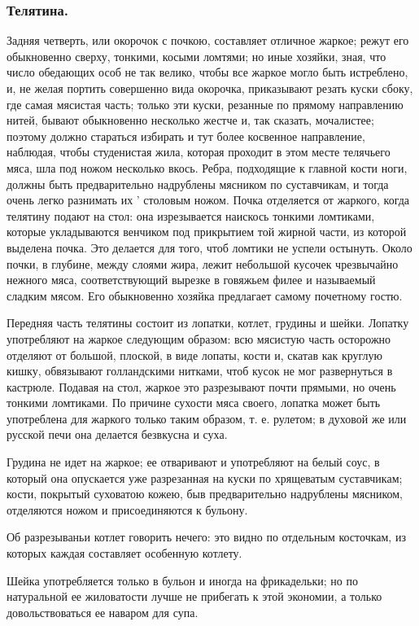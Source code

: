 \subsubsection{Телятина.}
Задняя четверть, или окорочок с почкою, составляет отличное жаркое; режут его обыкновенно сверху, тонкими, косыми ломтями; но иные хозяйки, зная, что число обедающих особ не так велико, чтобы все жаркое могло быть истреблено, и, не желая портить совершенно вида окорочка, приказывают резать куски сбоку, где самая мясистая часть; только эти куски, резанные по прямому направлению нитей, бывают обыкновенно несколько жестче и, так сказать, мочалистее; поэтому должно стараться избирать и тут более косвенное направление, наблюдая, чтобы студенистая жила, которая проходит в этом месте телячьего мяса, шла под ножом несколько вкось. Ребра, подходящие к главной кости ноги, должны быть предварительно надрублены мясником по суставчикам, и тогда очень легко разнимать их ' столовым ножом. Почка отделяется от жаркого, когда телятину подают на стол: она изрезывается наискось тонкими ломтиками, которые укладываются венчиком под прикрытием той жирной части, из которой выделена почка. Это делается для того, чтоб ломтики не успели остынуть. Около почки, в глубине, между слоями жира, лежит небольшой кусочек чрезвычайно нежного мяса, соответствующий вырезке в говяжьем филее и называемый сладким мясом. Его обыкновенно хозяйка предлагает самому почетному гостю.

Передняя часть телятины состоит из лопатки, котлет, грудины и шейки. Лопатку употребляют на жаркое следующим образом: всю мясистую часть осторожно отделяют от большой, плоской, в виде лопаты, кости и, скатав как круглую кишку, обвязывают голландскими нитками, чтоб кусок не мог развернуться в кастрюле. Подавая на стол, жаркое это разрезывают почти прямыми, но очень тонкими ломтиками. По причине сухости мяса своего, лопатка может быть употреблена для жаркого только таким образом, т. е. рулетом; в духовой же или русской печи она делается безвкусна и суха.

Грудина не идет на жаркое; ее отваривают и употребляют на белый соус, в который она опускается уже разрезанная на куски по хрящеватым суставчикам; кости, покрытый суховатою кожею, быв предварительно надрублены мясником, отделяются ножом и присоединяются к бульону.

Об разрезываньи котлет говорить нечего: это видно по отдельным косточкам, из которых каждая составляет особенную котлету.

Шейка употребляется только в бульон и иногда на фрикадельки; но по натуральной ее жиловатости лучше не прибегать к этой экономии, а только довольствоваться ее наваром для супа.

